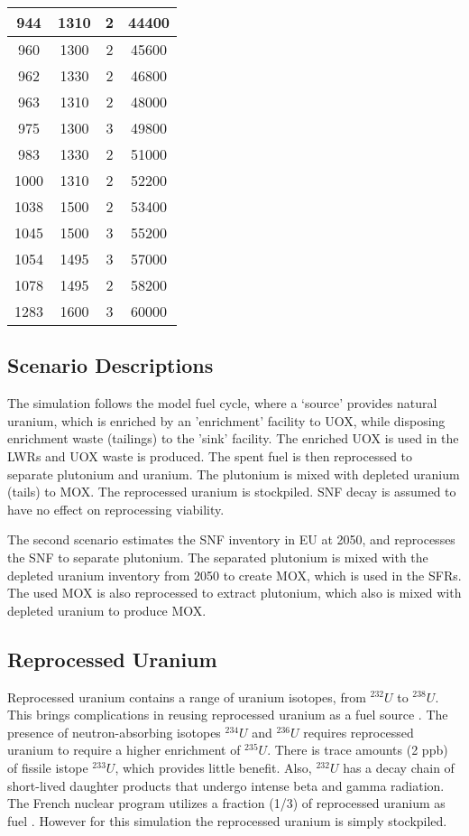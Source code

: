 \begin{table}[h]
\begin{tabular}{|c|c|c|c|}
		944 & 1310 & 2 & 44400 \\ \hline
		960 & 1300 & 2 & 45600 \\ \hline
		962 & 1330 & 2 & 46800 \\ \hline
		963 & 1310 & 2 & 48000 \\ \hline
		975 & 1300 & 3 & 49800 \\ \hline
		983 & 1330 & 2 & 51000 \\ \hline
		1000 & 1310 & 2 & 52200 \\ \hline
		1038 & 1500 & 2 & 53400 \\ \hline
		1045 & 1500 & 3 & 55200 \\ \hline
		1054 & 1495 & 3 & 57000 \\ \hline
		1078 & 1495 & 2 & 58200 \\ \hline
		1283 & 1600 & 3 & 60000 \\ \hline
		
		\end{tabular}
\end{table}



\subsection{Scenario Descriptions}
The simulation follows the model fuel cycle, where a `source'
provides natural uranium, which is enriched by an 'enrichment'
facility to \gls{UOX}, while disposing enrichment waste (tailings)
to the 'sink' facility. The enriched \gls{UOX} is used
in the \gls{LWR}s and \gls{UOX} waste is produced. The spent fuel
is then reprocessed to separate plutonium and uranium.
The plutonium is mixed with depleted uranium (tails) to \gls{MOX}.
The reprocessed uranium is stockpiled. \gls{SNF} decay is assumed
to have no effect on reprocessing viability.

The second scenario estimates the \gls{SNF} inventory in EU at 2050,
and reprocesses the \gls{SNF} to separate plutonium. The separated
plutonium is mixed with the depleted uranium inventory from 2050
to create \gls{MOX}, which is used in the \gls{SFR}s. The used
\gls{MOX} is also reprocessed to extract plutonium, which also
is mixed with depleted uranium to produce \gls{MOX}.



\subsection{Reprocessed Uranium}
Reprocessed uranium contains a range of uranium isotopes, from $^{232}U$ to $^{238}U$.
This brings complications in reusing reprocessed uranium as a fuel source \cite{IAEA_management_2007}.
The presence of neutron-absorbing isotopes $^{234}U$ and $^{236}U$ requires reprocessed uranium
to require a higher enrichment of $^{235}U$. There is trace amounts (2 ppb) of fissile istope $^{233}U$,
which provides little benefit.  
Also, $^{232}U$ has a decay chain of short-lived
daughter products that undergo intense beta and gamma radiation.
The French nuclear program utilizes a fraction (1/3) of reprocessed uranium as fuel \cite{IAEA_management_200&}.
However for this simulation the reprocessed uranium is simply stockpiled.


